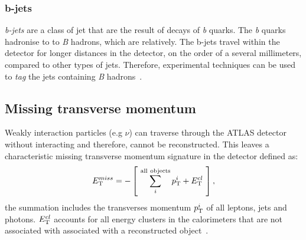 \subsubsection{b-jets}
\emph{b-jets} are a class of jet that are the result of decays of \emph{b} quarks. The \emph{b} quarks hadronise to to \emph{B} hadrons, which are relatively. The b-jets travel within the detector for longer distances in the detector, on the order of a several millimeters, compared to other types of jets. Therefore, experimental techniques can be used to \emph{tag} the jets containing \emph{B} hadrons~\cite{ATLAS:PHYS-PUB-2015-022,ATLAS:PHYS-PUB-2016-012}.

\subsection{Missing transverse momentum}
Weakly interaction particles (e.g $\nu$) can traverse through the ATLAS detector without interacting and therefore, cannot be reconstructed. This leaves a characteristic missing transverse momentum signature in the detector defined as: 
\begin{equation}
   E_{\text{T}}^{miss} = - \left[ ~\sum^{\mathrm{all ~objects}}_i p_{\text{T}}^i + E_{\text{T}}^{cl}~ \right],
\end{equation}
the summation includes the transverses momentum $p_{\text{T}}^i$ of all leptons, jets and photons. $E_{\text{T}}^{cl}$ accounts for all energy clusters in the calorimeters that are not associated with associated with a reconstructed object~\cite{ATL-PHYS-PUB-2015-027}.

\clearpage